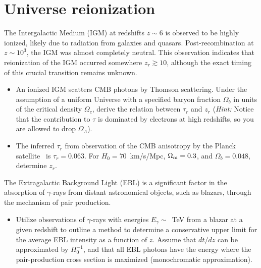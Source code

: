 \section{Universe reionization}

{\color{red}The Intergalactic Medium (IGM) at redshifts $z \sim 6$ is observed to be highly ionized, likely due to radiation from galaxies and quasars. Post-recombination at $z \sim 10^3$, the IGM was almost completely neutral. This observation indicates that reionization of the IGM occurred somewhere $z_r \gtrsim 10$, although the exact timing of this crucial transition remains unknown. 

\begin{itemize}
\item An ionized IGM scatters CMB photons by Thomson scattering. Under the assumption of a uniform Universe with a specified baryon fraction $\Omega_b$ in units of the critical density $\Omega_c$, derive the relation between $\tau_r$ and $z_r$ (\emph{Hint:} Notice that the contribution to $\tau$ is dominated by electrons at high redshifts, so you are allowed to drop $\Omega_\Lambda$).


\item The inferred $\tau_r$ from observation of the CMB anisotropy by the Planck satellite~\cite{} is $\tau_r = 0.063$. For $H_0 = 70$~km/s/Mpc, $\Omega_{\rm m} = 0.3$, and $\Omega_b = 0.048$, determine $z_r$.

\end{itemize}


The Extragalactic Background Light (EBL) is a significant factor in the absorption of $\gamma$-rays from distant astronomical objects, such as blazars, through the mechanism of pair production. 

\begin{itemize}
\item Utilize observations of $\gamma$-rays with energies $E_\gamma \sim$~TeV from a blazar at a given redshift to outline a method to determine a conservative upper limit for the average EBL intensity as a function of $z$. Assume that $dt/dz$ can be approximated by $H_0^{-1}$, and that all EBL photons have the energy where the pair-production cross section is maximized (monochromatic approximation).
\end{itemize}}
